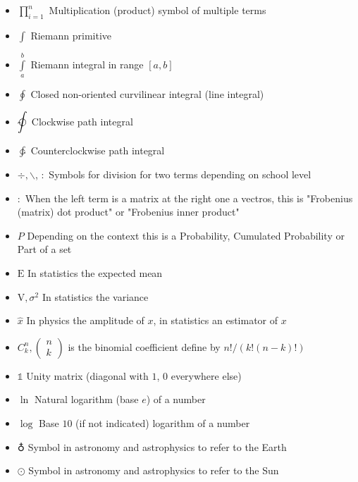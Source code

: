 \documentclass[12pt,a4paper,twoside,openright]{report}
\newcounter{def}
\theoremstyle{definition}
\theoremstyle{itexmp}
\numberwithin{equation}{section}
\begin{document}
\begin{itemize}[label={},leftmargin=0.5cm]
	 	\item $\displaystyle \prod_{i=1}^n$ Multiplication (product) symbol of multiple terms
	 	\item $\displaystyle\int$ Riemann primitive
	 	\item $\displaystyle\int\limits_a^b$ Riemann integral in range $[a,b]$
	 	\item $\displaystyle\oint$ Closed non-oriented curvilinear integral (line integral)
	 	\item $\displaystyle\ointclockwise$ Clockwise path integral
	 	\item $\displaystyle\ointctrclockwise$ Counterclockwise path integral
	 	\item $\div, \backslash$, $:$ Symbols for division for two terms depending on school level
	 	\item $:$ When the left term is a matrix at the right one a vectros, this is "Frobenius (matrix) dot product" or "Frobenius inner product"
	 	\item $P$ Depending on the context this is a Probability, Cumulated Probability or Part of a set
	 	\item $\text{E}$ In statistics the expected mean
	 	\item $\text{V},\sigma^2$ In statistics the variance
	 	\item $\hat{x}$ In physics the amplitude of $x$, in statistics an estimator of $x$
	 	\item $C_k^n,\begin{pmatrix}n\\k\end{pmatrix}$ is the binomial coefficient define by $n!/(k!(n-k)!)$
	 	\item $\mathds{1}$ Unity matrix (diagonal with $1$, $0$ everywhere else)
	 	\item $\ln$ Natural logarithm (base $e$) of a number
	 	\item $\log$ Base $10$ (if not indicated) logarithm of a number
	 	\item $\earth$ Symbol in astronomy and astrophysics to refer to the Earth
	 	\item $\odot$ Symbol in astronomy and astrophysics to refer to the Sun
	\end{itemize}


\end{document}
